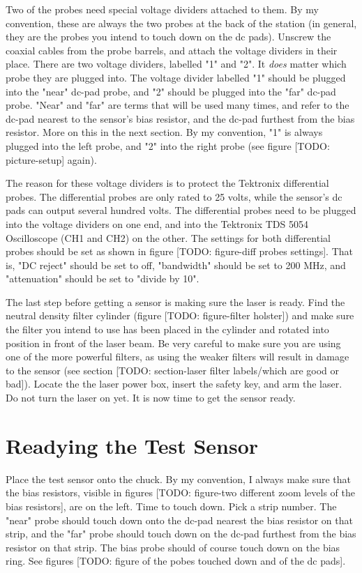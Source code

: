 \documentclass{report}
\begin{document}
            Two of the probes need special voltage dividers attached to them. By my convention, these are always the two probes at the back of the station (in general, they are the probes you intend to touch down on the dc pads). Unscrew the coaxial cables from the probe barrels, and attach the voltage dividers in their place. There are two voltage dividers, labelled "1" and "2". It \textit{does} matter which probe they are plugged into. The voltage divider labelled "1" should be plugged into the "near" dc-pad probe, and "2" should be plugged into the "far" dc-pad probe. "Near" and "far" are terms that will be used many times, and refer to the dc-pad nearest to the sensor's bias resistor, and the dc-pad furthest from the bias resistor. More on this in the next section. By my convention, "1" is always plugged into the left probe, and "2" into the right probe (see figure [TODO: picture-setup] again).
            
            The reason for these voltage dividers is to protect the Tektronix differential probes. The differential probes are only rated to 25 volts, while the sensor's dc pads can output several hundred volts. The differential probes need to be plugged into the voltage dividers on one end, and into the Tektronix TDS 5054 Oscilloscope (CH1 and CH2) on the other. The settings for both differential probes should be set as shown in figure [TODO: figure-diff probes settings]. That is, "DC reject" should be set to off, "bandwidth" should be set to 200 MHz, and "attenuation" should be set to "divide by 10".

            The last step before getting a sensor is making sure the laser is ready. Find the neutral density filter cylinder (figure [TODO: figure-filter holster]) and make sure the filter you intend to use has been placed in the cylinder and rotated into position in front of the laser beam. Be very careful to make sure you are using one of the more powerful filters, as using the weaker filters will result in damage to the sensor (see section [TODO: section-laser filter labels/which are good or bad]). Locate the the laser power box, insert the safety key, and arm the laser. Do not turn the laser on yet. It is now time to get the sensor ready.

        \section{ Readying the Test Sensor }
            Place the test sensor onto the chuck. By my convention, I always make sure that the bias resistors, visible in figures [TODO: figure-two different zoom levels of the bias resistors], are on the left. Time to touch down. Pick a strip number. The "near" probe should touch down onto the dc-pad nearest the bias resistor on that strip, and the "far" probe should touch down on the dc-pad furthest from the bias resistor on that strip. The bias probe should of course touch down on the bias ring. See figures [TODO: figure of the pobes touched down and of the dc pads].
\end{document}
